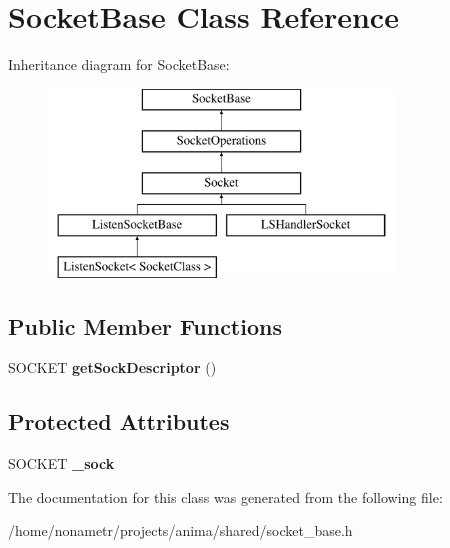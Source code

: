 \hypertarget{classSocketBase}{
\section{SocketBase Class Reference}
\label{classSocketBase}
}
Inheritance diagram for SocketBase:\begin{figure}[H]
\begin{center}
\leavevmode
\includegraphics[height=5.000000cm]{classSocketBase}
\end{center}
\end{figure}
\subsection*{Public Member Functions}
\begin{DoxyCompactItemize}
\item 
\hypertarget{classSocketBase_ab32e06f32c8762d4261b98793fabcf06}{
SOCKET {\bfseries getSockDescriptor} ()}
\label{classSocketBase_ab32e06f32c8762d4261b98793fabcf06}

\end{DoxyCompactItemize}
\subsection*{Protected Attributes}
\begin{DoxyCompactItemize}
\item 
\hypertarget{classSocketBase_a07179135c511d69e46cb29fcb1c2b8af}{
SOCKET {\bfseries \_\-sock}}
\label{classSocketBase_a07179135c511d69e46cb29fcb1c2b8af}

\end{DoxyCompactItemize}


The documentation for this class was generated from the following file:\begin{DoxyCompactItemize}
\item 
/home/nonametr/projects/anima/shared/socket\_\-base.h\end{DoxyCompactItemize}
